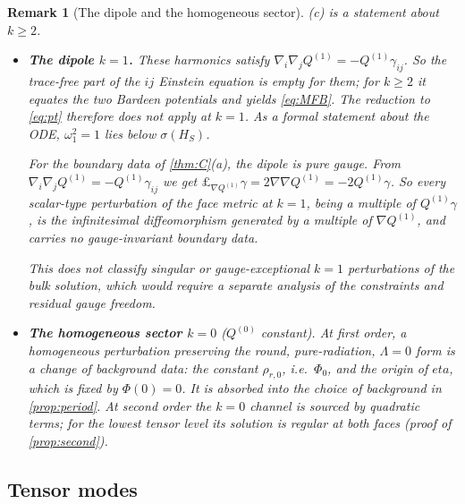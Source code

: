 \documentclass[11pt]{article}
\theoremstyle{canonmath}
\newtheorem{remark}[theorem]{Remark}
\theoremstyle{canonpostulate}
\theoremstyle{canonproposition}
\theoremstyle{canonmath}
\theoremstyle{canonproposition}
\def\mathcal#1{#1}%
\def\eta{eta}%
\begin{document}
\begin{remark}[The dipole and the homogeneous sector]\label{rem:dipole}
(c) is a statement about $k\ge2$.
\begin{itemize}
\item \textbf{The dipole $k=1$.} These harmonics satisfy $\nabla_i\nabla_jQ^{(1)} = -Q^{(1)}\gamma_{ij}$. So the trace-free part of the $ij$ Einstein equation is empty for them; for $k\ge2$ it equates the two Bardeen potentials and yields \eqref{eq:MFB}. The reduction to \eqref{eq:pt} therefore does not apply at $k=1$. As a formal statement about the ODE, $\omega_1^2 = 1$ lies below $\sigma(\mathcal{H}_S)$.

For the boundary data of \cref{thm:C}(a), the dipole is pure gauge. From $\nabla_i\nabla_jQ^{(1)} = -Q^{(1)}\gamma_{ij}$ we get $\pounds_{\nabla Q^{(1)}}\gamma = 2\nabla\nabla Q^{(1)} = -2Q^{(1)}\gamma$. So every scalar-type perturbation of the face metric at $k=1$, being a multiple of $Q^{(1)}\gamma$, is the infinitesimal diffeomorphism generated by a multiple of $\nabla Q^{(1)}$, and carries no gauge-invariant boundary data.

This does not classify singular or gauge-exceptional $k=1$ perturbations of the bulk solution, which would require a separate analysis of the constraints and residual gauge freedom.
\item \textbf{The homogeneous sector $k=0$} ($Q^{(0)}$ constant). At first order, a homogeneous perturbation preserving the round, pure-radiation, $\Lambda=0$ form is a change of background data: the constant $\rho_{r,0}$, i.e.\ $\Phi_0$, and the origin of $\eta$, which is fixed by $\Phi(0)=0$. It is absorbed into the choice of background in \cref{prop:period}. At second order the $k=0$ channel is sourced by quadratic terms; for the lowest tensor level its solution is regular at both faces (proof of \cref{prop:second}).
\end{itemize}
\end{remark}

\subsection{Tensor modes}
\end{document}
